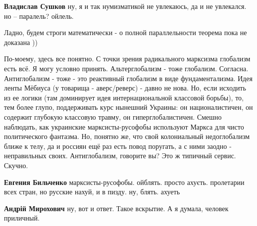 \begin{itemize}
\begin{itemize}
\textbf{Владислав Сушков} ну, я и так нумизматикой не увлекаюсь, да и не увлекался.
но – паралель? ойлель.

 
Ладно, будем строги математически - о полной параллельности теорема пока не доказана ))

 

По-моему, здесь все понятно. С точки зрения радикального марксизма глобализм
есть всё. Я могу условно принять. Альтерглобализм - тоже глобализм. Согласна.
Антиглобализм - тоже - это реактивный глобализм в виде фундаментализма. Идея
ленты Мёбиуса (у товарища - аверс/реверс) - давно не нова. Но, если исходить из
ее логики (там доминирует идея интернациональной классовой борьбы), то, тем
более глупо, поддерживать курс нынешний Украины: он националистичен, он
содержит глубокую классовую травму, он гиперглобалистичен. Смешно наблюдать,
как украинские марксисты-русофобы используют Маркса для чисто политического
фантазма. Но, понятно же, что свой колониальный недоглобализм ближе к телу, да
и россиян ещё раз есть повод поругать, а с ними заодно - неправильных своих.
Антиглобализм, говорите вы? Это ж типичный сервис. Скучно.

 
\textbf{Евгения Бильченко} марксисты-русофобы. ойблять. просто ахуєть. пролетарии всех стран, но русские нахуй, и в пизду. ну, блять. ахуеть

 
\textbf{Андрій Мирохович} ну, вот и ответ. Такое вскрытие. А я думала, человек приличный.


\end{itemize}
\end{itemize}
